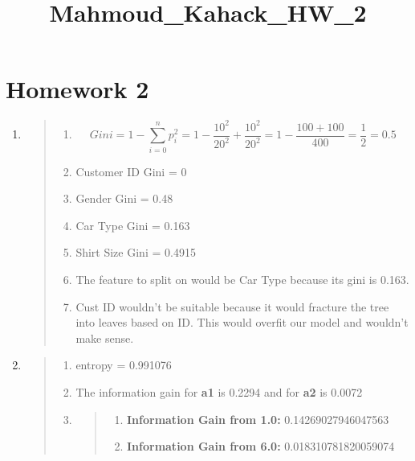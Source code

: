 \documentclass[11pt]{article}
\title{Mahmoud\_Kahack\_HW\_2}
\providecommand{\tightlist}{%
      \setlength{\itemsep}{0pt}\setlength{\parskip}{0pt}}
\begin{document}
    
    
    \maketitle
    
    

    
    \section{Homework 2}\label{homework-2}

    \begin{enumerate}
\def\labelenumi{\arabic{enumi}.}
\setcounter{enumi}{1}
\item
  \begin{quote}
  \begin{enumerate}
  \def\labelenumii{\alph{enumii}.}
  \tightlist
  \item
    \[Gini = 1 - \sum_{i=0}^n p_i^2  = 1 - \frac{10^2} {20^2} + \frac{10^2} {20^2} = 1 - \frac{100 + 100} {400} = \frac {1} {2} = 0.5\]
  \item
    Customer ID Gini = 0
  \item
    Gender Gini = 0.48 
  \item
    Car Type Gini = 0.163 
  \item
    Shirt Size Gini = 0.4915 
  \item
    The feature to split on would be Car Type because its gini is 0.163.
  \item
    Cust ID wouldn't be suitable because it would fracture the tree into
    leaves based on ID. This would overfit our model and wouldn't make
    sense.
  \end{enumerate}
  \end{quote}
\item
  \begin{quote}
  \begin{enumerate}
  \def\labelenumii{\alph{enumii}.}
  \item
    entropy = 0.991076 
  \item
    The information gain for \textbf{a1} is 0.2294 and for \textbf{a2}
    is 0.0072 
  \item
    \begin{quote}
    \begin{enumerate}
    \def\labelenumiii{\roman{enumiii}.}
    \tightlist
    \item
      \textbf{Information Gain from 1.0:} 0.14269027946047563 
    \item
      \textbf{Information Gain from 6.0:} 0.018310781820059074 

\end{enumerate}
\end{quote}
\end{enumerate}
\end{quote}
\end{enumerate}
\end{document}
